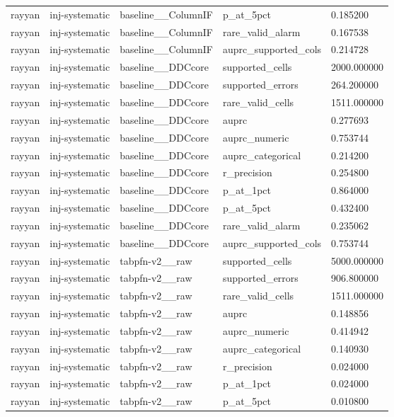 \begin{tabular}{lllll}
rayyan & inj-systematic & baseline\_\_ColumnIF & p\_at\_5pct & 0.185200 \\
rayyan & inj-systematic & baseline\_\_ColumnIF & rare\_valid\_alarm & 0.167538 \\
rayyan & inj-systematic & baseline\_\_ColumnIF & auprc\_supported\_cols & 0.214728 \\
rayyan & inj-systematic & baseline\_\_DDCcore & supported\_cells & 2000.000000 \\
rayyan & inj-systematic & baseline\_\_DDCcore & supported\_errors & 264.200000 \\
rayyan & inj-systematic & baseline\_\_DDCcore & rare\_valid\_cells & 1511.000000 \\
rayyan & inj-systematic & baseline\_\_DDCcore & auprc & 0.277693 \\
rayyan & inj-systematic & baseline\_\_DDCcore & auprc\_numeric & 0.753744 \\
rayyan & inj-systematic & baseline\_\_DDCcore & auprc\_categorical & 0.214200 \\
rayyan & inj-systematic & baseline\_\_DDCcore & r\_precision & 0.254800 \\
rayyan & inj-systematic & baseline\_\_DDCcore & p\_at\_1pct & 0.864000 \\
rayyan & inj-systematic & baseline\_\_DDCcore & p\_at\_5pct & 0.432400 \\
rayyan & inj-systematic & baseline\_\_DDCcore & rare\_valid\_alarm & 0.235062 \\
rayyan & inj-systematic & baseline\_\_DDCcore & auprc\_supported\_cols & 0.753744 \\
rayyan & inj-systematic & tabpfn-v2\_\_raw & supported\_cells & 5000.000000 \\
rayyan & inj-systematic & tabpfn-v2\_\_raw & supported\_errors & 906.800000 \\
rayyan & inj-systematic & tabpfn-v2\_\_raw & rare\_valid\_cells & 1511.000000 \\
rayyan & inj-systematic & tabpfn-v2\_\_raw & auprc & 0.148856 \\
rayyan & inj-systematic & tabpfn-v2\_\_raw & auprc\_numeric & 0.414942 \\
rayyan & inj-systematic & tabpfn-v2\_\_raw & auprc\_categorical & 0.140930 \\
rayyan & inj-systematic & tabpfn-v2\_\_raw & r\_precision & 0.024000 \\
rayyan & inj-systematic & tabpfn-v2\_\_raw & p\_at\_1pct & 0.024000 \\
rayyan & inj-systematic & tabpfn-v2\_\_raw & p\_at\_5pct & 0.010800 \\

\end{tabular}
